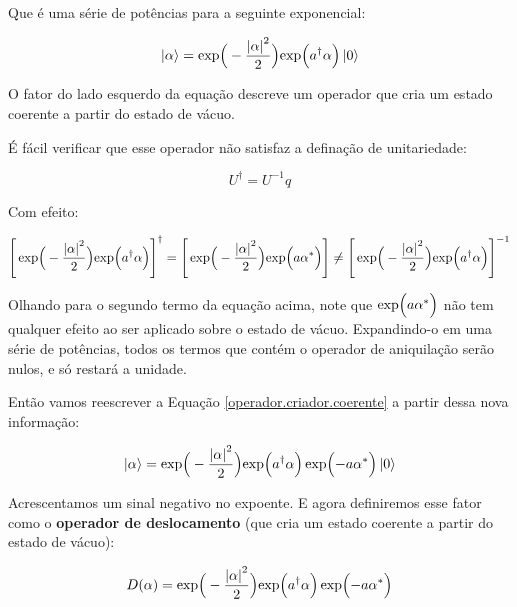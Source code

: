 \documentclass[12pt,a4paper]{report}
\begin{document}
Que é uma série de potências para a seguinte exponencial:

\begin{equation}
   \ket{\alpha}=\exp\Bigr(-\frac{\abs{\alpha}^2}{2}\Bigl)\exp\Bigl(a^{\dag}\alpha\Bigr)\ket{0}
   \label{operador.criador.coerente}
\end{equation}

O fator do lado esquerdo da equação descreve um operador que cria um estado coerente a partir do estado de vácuo.

É fácil verificar que esse operador não satisfaz a definação de unitariedade:

\begin{equation*}
    U^{\dag}=U^{-1} q
\end{equation*}

Com efeito:

\begin{equation*}
    \Bigg[\exp\Bigr(-\frac{\abs{\alpha}^2}{2}\Bigl)\exp\Bigl(a^{\dag}\alpha\Bigr)\Bigg]^{\dag}=\Bigg[\exp\Bigr(-\frac{\abs{\alpha}^2}{2}\Bigl)\exp\Bigl(a\alpha^*\Bigr)\Bigg]\neq\Bigg[\exp\Bigr(-\frac{\abs{\alpha}^2}{2}\Bigl)\exp\Bigl(a^{\dag}\alpha\Bigr)\Bigg]^{-1}
\end{equation*}

Olhando para o segundo termo da equação acima, note que $\exp\Bigl(a\alpha^*\Bigr)$ não tem qualquer efeito ao ser aplicado sobre o estado de vácuo. Expandindo-o em uma série de potências, todos os termos que contém o operador de aniquilação serão nulos, e só restará a unidade.

Então vamos reescrever a Equação \ref{operador.criador.coerente} a partir dessa nova informação:

\begin{equation}
   \ket{\alpha}=\exp\Bigr(-\frac{\abs{\alpha}^2}{2}\Bigl)\exp\Bigl(a^{\dag}\alpha\Bigr)\exp\Bigl(-a\alpha^*\Bigr)\ket{0}
\end{equation}

Acrescentamos um sinal negativo no expoente. E agora definiremos esse fator como o \textbf{operador de deslocamento} (que cria um estado coerente a partir do estado de vácuo):

\begin{equation}
    D(\alpha)=\exp\Bigr(-\frac{\abs{\alpha}^2}{2}\Bigl)\exp\Bigl(a^{\dag}\alpha\Bigr)\exp\Bigl(-a\alpha^*\Bigr)
\end{equation}
\end{document}
